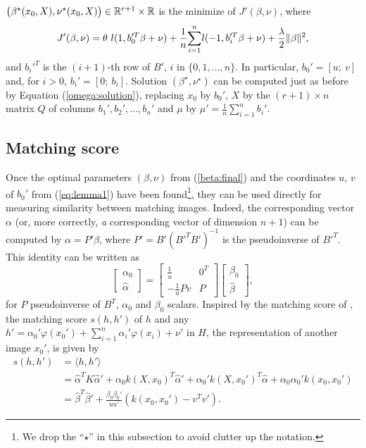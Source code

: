 $\big(\beta^\star(x_0,X),\nu^\star(x_0,X)\big)\in\mathbb R^{r+1}\times\mathbb R$ is the minimize of $J'(\beta, \nu)$, where
\begin{align}
J'(\beta, \nu)=
 \theta\ l(1, b_0'^T\beta+\nu) +\dfrac{1}{n}\displaystyle{\sum_{i=1}^n} l(-1,b_i'^T\beta+\nu)
+\dfrac{\lambda}{2}\|\beta\|^2,\label{beta:final}
\end{align}
and $b_i'^T$ is the $(i+1)$-th row of $B'$, $i$ in $\{0,1,...,n\}$. In particular, $b_0'=[u; \ v]$ and, for $i>0$, $b_i'=[0; \ b_i]$. Solution $(\beta^\star,\nu^\star)$ can be computed just as before by Equation (\ref{omega:solution}), replacing $x_0$ by $b_0'$, $X$ by the $(r+1)\times n$ matrix $Q$ of columns $b_1', b_2',...,b_n'$ and $\mu$ by $\mu' = \frac{1}{n}\sum_{i=1}^n b_i'$.


\subsection{Matching score}
Once the optimal parameters $(\beta, \nu)$ from (\ref{beta:final}) and the coordinates $u$, $v$ of $b_0'$ from (\ref{eq:lemma1}) have been found\footnote{We drop the ``$\star$'' in this subsection to avoid clutter up the notation.}, they can be used directly for measuring similarity between matching images. 
Indeed, the corresponding vector $\alpha$ (or, more correctly, \textit{a} corresponding vector of dimension $n+1$) can be computed by $\alpha = P'\beta$, where $P'=B'(B'^TB')^{-1}$  is the pseudoinverse of $B'^T$. This identity can be written as 
\begin{equation}
\begin{bmatrix} \alpha_0 \\ \hat{\alpha} \end{bmatrix} = \begin{bmatrix} \frac{1}{u} & 0^T \\-\frac{1}{u}Pv & P  \end{bmatrix} \begin{bmatrix}\beta_0 \\ \hat{\beta} \end{bmatrix},
\end{equation}
for $P$ pseudoinverse of $B^T$, $\alpha_0$ and $\beta_0$ scalars.
Inspired by the matching score of \cite{ZePe15}, the matching score $s(h,h')$ of $h$ and any $h'=\alpha_0'\varphi(x_0')+\sum_{i=1}^n \alpha_i'\varphi (x_i)+\nu'$ in $H$, the representation of another image $x_0'$, is given by  
\begin{equation}
\begin{split}
s(h,h') & = \langle h, h'\rangle \\
		& = \hat{\alpha}^{T} K\hat{\alpha}'+\alpha_0k(X, x_0)^T\hat{\alpha}'+\alpha_0'k(X, x_0')^T\hat{\alpha}+\alpha_0\alpha_0'k(x_0,x_0')\\
		& = \hat{\beta}^T\hat{\beta}'+\frac{\beta_0\beta_0'}{uu'}(k(x_0,x_0')-v^Tv').
\end{split}
\end{equation}



